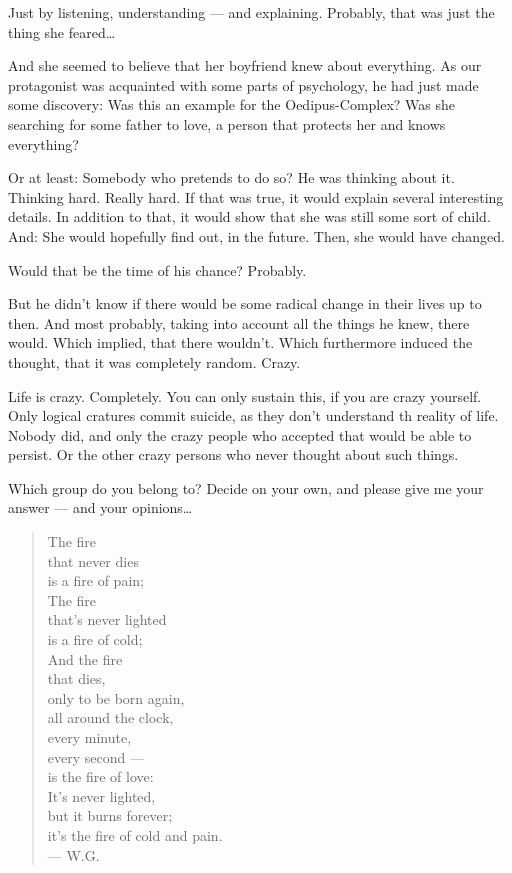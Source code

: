 Just by listening, understanding --- and explaining. 
Probably, that was just the thing she feared\ldots

And she seemed to believe that her boyfriend knew about everything. 
As our protagonist was acquainted with some parts of psychology, he had just made some discovery: Was this an example for the Oedipus-Complex? Was she searching for some father to love, a person that protects her and knows everything?

Or at least: Somebody who pretends to do so?
He was thinking about it. 
Thinking hard. 
Really hard. 
If that was true, it would explain several interesting details. 
In addition to that, it would show that she was still some sort of child. 
And: She would hopefully find out, in the future. 
Then, she would have changed.

Would that be the time of his chance?
Probably.

But he didn't know if there would be some radical change in their lives up to then. 
And most probably, taking into account all the things he knew, there would. 
Which implied, that there wouldn't. 
Which furthermore induced the thought, that it was completely random. 
Crazy.

Life is crazy. 
Completely. 
You can only sustain this, if you are crazy yourself. Only logical cratures commit suicide, as they don't understand th reality of life. 
Nobody did, and only the crazy people who accepted that would be able to persist. 
Or the other crazy persons who never thought about such things.

Which group do you belong to?
Decide on your own, and please give me your answer --- and your opinions\ldots

\begin{quote}
The fire \\
that never dies \\
is a fire of pain; \\
The fire \\
that's never lighted \\
is a fire of cold;\\
And the fire \\
that dies, \\
only to be born again, \\
all around the clock, \\
every minute, \\
every second --- \\
is the fire of love: \\
It's never lighted, \\
but it burns forever; \\
it's the fire of cold and pain. \\
--- W.G.
\end{quote}

